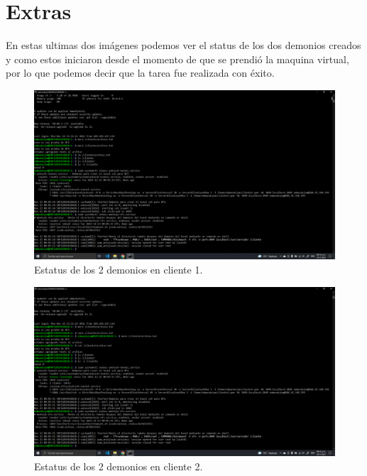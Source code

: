 \documentclass[11pt]{article}
\begin{document}
	\section{Extras}
		En estas ultimas dos imágenes podemos ver el status de los dos demonios creados y como estos iniciaron desde el momento de que se prendió la maquina virtual, por lo que podemos decir que la tarea fue realizada con éxito.
		\begin{figure}[H]
			\centering
			\includegraphics[scale=0.34]{resources/extrac1.png}
			\caption{Estatus de los 2 demonios en cliente 1.}\label{fig:picture}
		\end{figure}
		\begin{figure}[H]
			\centering
			\includegraphics[scale=0.34]{resources/extrac2.png}
			\caption{Estatus de los 2 demonios en cliente 2.}\label{fig:picture}
		\end{figure}
\end{document}

